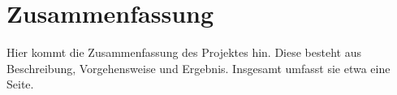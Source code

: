 \chapter{Zusammenfassung}\label{c:Zusammenfassung} %

Hier kommt die Zusammenfassung des Projektes hin. Diese besteht aus Beschreibung, Vorgehensweise und Ergebnis.
Insgesamt umfasst sie etwa eine Seite.